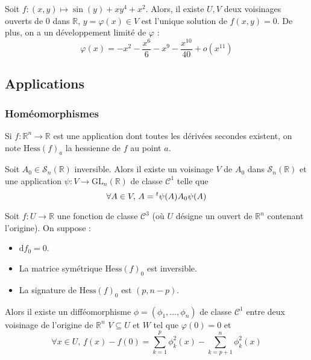 
	\begin{example}
		Soit $f : (x,y) \mapsto \sin(y) + xy^4 + x^2$. Alors, il existe $U, V$ deux voisinages ouverts de $0$ dans $\mathbb{R}$, $y = \varphi(x) \in V$ est l'unique solution de $f(x,y) = 0$. De plus, on a un développement limité de $\varphi$ :
		\[ \varphi(x) = -x^2 - \frac{x^6}{6} - x^9 - \frac{x^{10}}{40} + o(x^{11}) \]
	\end{example}

	\subsection{Applications}

	\subsubsection{Homéomorphismes}


	\begin{notation}
		Si $f : \mathbb{R}^n \rightarrow \mathbb{R}$ est une application dont toutes les dérivées secondes existent, on note $\mathrm{Hess}(f)_a$ la hessienne de $f$ au point $a$.
	\end{notation}

	\begin{lemma}
		Soit $A_0 \in \mathcal{S}_n(\mathbb{R})$ inversible. Alors il existe un voisinage $V$ de $A_0$ dans $\mathcal{S}_n(\mathbb{R})$ et une application $\psi : V \rightarrow \mathrm{GL}_n(\mathbb{R})$ de classe $\mathcal{C}^1$ telle que
		\[ \forall A \in V, \, A = \mathstrut ^t \psi(A) A_0 \psi(A) \]
	\end{lemma}


	\begin{lemma}[Morse]
		Soit $f : U \rightarrow \mathbb{R}$ une fonction de classe $\mathcal{C}^3$ (où $U$ désigne un ouvert de $\mathbb{R}^n$ contenant l'origine). On suppose :
		\begin{itemize}
			\item $\mathrm{d} f_0 = 0$.
			\item La matrice symétrique $\mathrm{Hess} (f)_0$ est inversible.
			\item La signature de $\mathrm{Hess}(f)_0$ est $(p, n-p)$.
		\end{itemize}
		Alors il existe un difféomorphisme $\phi = (\phi_1, \dots, \phi_n)$ de classe $\mathcal{C}^1$ entre deux voisinage de l'origine de $\mathbb{R}^n$ $V \subseteq U$ et $W$ tel que $\varphi(0) = 0$ et
		\[ \forall x \in U, \, f(x) - f(0) = \sum_{k=1}^p \phi_k^2(x) - \sum_{k=p+1}^n \phi_k^2(x) \]
	\end{lemma}

